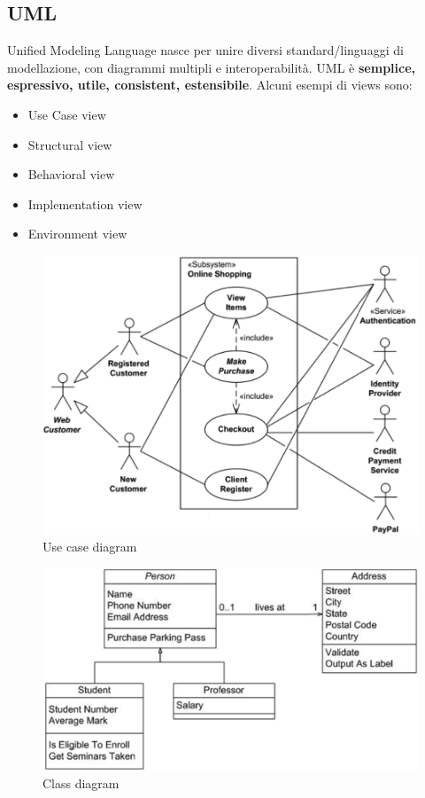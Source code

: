 \documentclass[11pt]{article}
\begin{document}
\subsection{UML}
Unified Modeling Language nasce per unire diversi standard/linguaggi di modellazione, con diagrammi multipli e interoperabilità. UML è \textbf{semplice, espressivo, utile, consistent, estensibile}. Alcuni esempi di views sono:
\begin{itemize}
    \item Use Case view
    \item Structural view
    \item Behavioral view
    \item Implementation view
    \item Environment view
\end{itemize}
\begin{figure}[H]
    \centering
    \includegraphics[width=0.6\linewidth]{res/teoria/UseCase.png}
    \caption{Use case diagram}
\end{figure}
\begin{figure}[H]
    \centering
    \includegraphics[width=0.6\linewidth]{res/teoria/ClassDiagram.png}
    \caption{Class diagram}
\end{figure}
\end{document}
